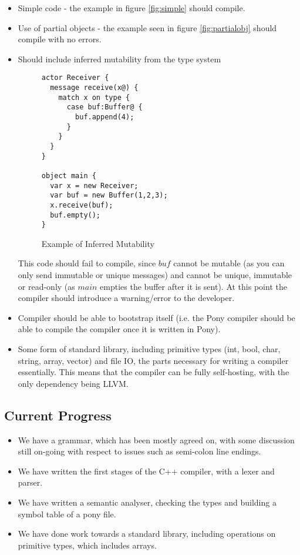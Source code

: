 \documentclass{article}
\begin{document}
\begin{itemize}

\item Simple code - the example in figure \ref{fig:simple} should compile.
\item Use of partial objects - the example seen in figure \ref{fig:partialobj} should compile with no errors.

\item Should include inferred mutability from the type system

\begin{figure}[H]
\begin{verbatim}
actor Receiver {
  message receive(x@) {
    match x on type {
      case buf:Buffer@ {
        buf.append(4);
      }
    }
  }
}

object main {
  var x = new Receiver;
  var buf = new Buffer(1,2,3);
  x.receive(buf);
  buf.empty();
}
\end{verbatim}
\caption{Example of Inferred Mutability}
\end{figure}

This code should fail to compile, since $buf$ cannot be mutable (as you can only send immutable or unique messages) and cannot be unique, immutable or read-only (as $main$ empties the buffer after it is sent).
At this point the compiler should introduce a warning/error to the developer.

\item Compiler should be able to bootstrap itself (i.e. the Pony compiler should be able to compile the compiler once it is written in Pony).

\item Some form of standard library, including primitive types (int, bool, char, string, array, vector) and file IO, the parts necessary for writing a compiler essentially.
	This means that the compiler can be fully self-hosting, with the only dependency being LLVM.
\end{itemize}

\subsection{Current Progress}

\begin{itemize}
\item We have a grammar, which has been mostly agreed on, with some discussion still on-going with respect to issues such as semi-colon line endings.
\item We have written the first stages of the C++ compiler, with a lexer and parser.
\item We have written a semantic analyser, checking the types and building a symbol table of a pony file.
\item We have done work towards a standard library, including operations on primitive types, which includes arrays.
\end{itemize}



\end{document}
